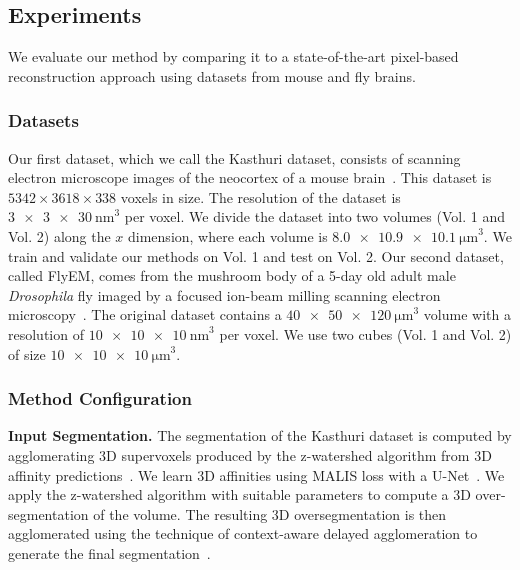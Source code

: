\subsection{Experiments}

We evaluate our method by comparing it to a state-of-the-art pixel-based reconstruction approach using datasets from mouse and fly brains.

\subsubsection{Datasets}
\label{sec:dataset}

Our first dataset, which we call the Kasthuri dataset, consists of scanning electron microscope images of the neocortex of a mouse brain~\cite{kasthuri2015saturated}. 
This dataset is $5342 \times 3618 \times 338$ voxels in size. 
The resolution of the dataset is $\SI[product-units=single]{3 x 3 x 30}{\nano\meter}^3$ per voxel. 
We divide the dataset into two volumes (Vol. 1 and Vol. 2) along the $x$ dimension, where each volume is $\SI[product-units=single]{8.0 x 10.9 x 10.1}{\micro\meter}^3$.
We train and validate our methods on Vol. 1 and test on Vol. 2.
Our second dataset, called FlyEM, comes from the mushroom body of a 5-day old adult male \textit{Drosophila} fly imaged by a focused ion-beam milling scanning electron microscopy~\cite{takemura2017connectome}.
The original dataset contains a $\SI[product-units=single]{40 x 50 x 120}{\micro\meter}^3$ volume with a resolution of $\SI[product-units=single]{10 x 10 x 10}{\nano\meter}^3$ per voxel. 
We use two cubes (Vol. 1 and Vol. 2) of size $\SI[product-units=single]{10 x 10 x 10}{\micro\meter}^3$.


\subsubsection{Method Configuration}

\noindent\textbf{Input Segmentation.}
The segmentation of the Kasthuri dataset is computed by agglomerating 3D supervoxels produced by the z-watershed algorithm from 3D affinity predictions~\cite{zlateski2015image}. 
We learn 3D affinities using MALIS loss with a U-Net~\cite{ronneberger2015u,Turaga:2009}. 
We apply the z-watershed algorithm with suitable parameters to compute a 3D over-segmentation of the volume. 
The resulting 3D oversegmentation is then agglomerated using the technique of context-aware delayed agglomeration to generate the final segmentation~\cite{10.1371/journal.pone.0125825}.

